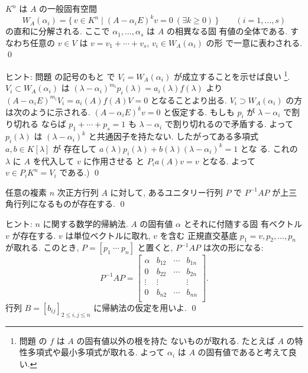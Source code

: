 \documentclass[12pt,twoside]{jarticle}
\begin{document}

\begin{question}[一般固有空間分解]
\label{q:generalized-eigenspace}
  $K^n$ は $A$ の一般固有空間
  \begin{equation*}
    W_A(\alpha_i) 
    = \{\, v\in K^n \mid (A-\alpha_i E)^k v = 0\ (\exists k \ge 0)\,\}
    \qquad (i=1,\dots,s)
  \end{equation*}
  の直和に分解される.  ここで $\alpha_1,\dots,\alpha_s$ は $A$ の相異なる固
  有値の全体である.  
  すなわち任意の $v\in V$ は $v=v_1+\cdots+v_s$, $v_i\in W_A(\alpha_i)$ の形
  で一意に表わされる. 
  \qed
\end{question}

\noindent
ヒント:  問題  の記号のもと
で $V_i=W_A(\alpha_i)$ が成立することを示せば良い%
\footnote{問題  の $f$ は $A$ の固有値以外の根を持た
  ないものが取れる. たとえば $A$ の特性多項式や最小多項式が取れる.
  よって $\alpha_i$ は $A$ の固有値であると考えて良い.}.
$V_i\subset W_A(\alpha_i)$ 
は $(\lambda-\alpha_i)^{m_i}p_i(\lambda)=a_i(\lambda)f(\lambda)$ 
より $(A - \alpha_i E)^{m_i}V_i = a_i(A)f(A)V = 0$ となることより出る.
$V_i\supset W_A(\alpha_i)$ の方は次のように示される.
$(A-\alpha_iE)^kv=0$ と仮定する.
もしも $p_i$ が $\lambda-\alpha_i$ で割り切れる
ならば $p_1+\cdots+p_s=1$ も $\lambda-\alpha_i$ で割り切れるので矛盾する.
よって $p_i(\lambda)$ は $(\lambda-\alpha_i)^k$ と共通因子を持たない.
したがってある多項式 $a,b\in K[\lambda]$ が
存在して $a(\lambda)p_i(\lambda)+b(\lambda)(\lambda-\alpha_i)^k=1$ とな
る.  これの $\lambda$ に $A$ を代入して $v$ に作用させる
と $P_ia(A)v = v$ となる.  よって $v\in P_iK^n=V_i$ である.)
\qed


\begin{question}[任意の行列の三角化可能性, 10点]
\label{q:triangularizable}
  任意の複素 $n$ 次正方行列 $A$ に対して,
  あるユニタリー行列 $P$ で $P^{-1}AP$ が上三角行列になるものが存在する.
  \qed
\end{question}

\noindent
ヒント: $n$ に関する数学的帰納法.  $A$ の固有値 $\alpha$ とそれに付随する固
有ベクトル $v$ が存在する. $v$ は単位ベクトルに取れ, $v$ を含む
正規直交基底 $p_1=v,p_2,\dots,p_n$ が取れる.  
このとき, $P=[p_1\ \cdots\ p_n]$ と置くと, $P^{-1}AP$ は次の形になる:
\begin{equation*}
  P^{-1}AP = 
  \begin{bmatrix}
    \alpha & b_{12} & \cdots & b_{1n} \\
       0   & b_{22} & \cdots & b_{2n} \\
    \vdots & \vdots &        & \vdots \\
       0   & b_{n2} & \cdots & b_{nn} \\
  \end{bmatrix}.
\end{equation*}
行列 $B=[b_{ij}]_{2\le i,j\le n}$ に帰納法の仮定を用いよ.
\qed
\end{document}
